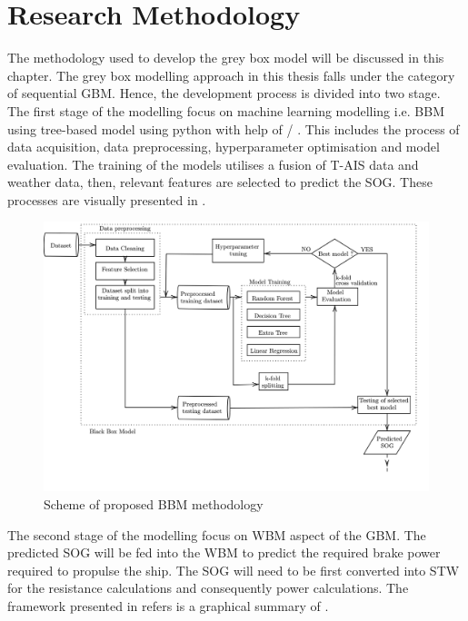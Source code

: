 \chapter{Research Methodology} \label{chp:method}

The methodology used to develop the grey box model will be discussed in this chapter. The grey box modelling approach in this thesis falls under the category of sequential GBM. Hence, the development process is divided into two stage. The first stage of the modelling focus on machine learning modelling i.e. BBM using tree-based model using python with help of \scikit/ . This includes the process of data acquisition, data preprocessing, hyperparameter optimisation and model evaluation. The training of the models utilises a fusion of T-AIS data and weather data, then, relevant features are selected to predict the SOG. These processes are visually presented in .\\

\begin{figure}[h]
    \centering
        \includegraphics[width=\textwidth]{02_figures/flowmethod_BBM_alt.png}
        \caption{Scheme of proposed BBM methodology}
        \label{fig:flowchart_BBM}
\end{figure}

The second stage of the modelling focus on WBM aspect of the GBM. The predicted SOG will be fed into the WBM to predict the required brake power required to propulse the ship. The SOG will need to be first converted into STW for the resistance calculations and consequently power calculations. The framework presented in  refers is a graphical summary of . 

